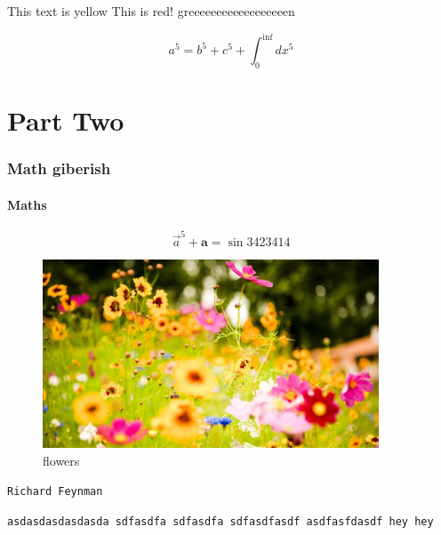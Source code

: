 \documentclass[11pt,a4paper]{article}
\begin{document}
{\color{yellow}This text is yellow}
{\color{red}This is red!}
{\color{green}greeeeeeeeeeeeeeeeeen}

\begin{center}\end{center}

\begin{equation}
a^5 = b^5 + c^5 + \int^{\inf}_{0}dx^5
\end{equation}

\part{Part Two}

\section{Math giberish}

\subsection{Maths}

$$\vec{a}^5 + \mathbf{a} = \sin{3423414}$$

\begin{figure}[H]
\centering
\includegraphics[width=10cm]{../../External/Images/flowers}
\caption{flowers}
\end{figure}

{\tt Richard Feynman}

{\tt asdasdasdasdasda
sdfasdfa
sdfasdfa
sdfasdfasdf
asdfasfdasdf hey hey}
\end{document}
